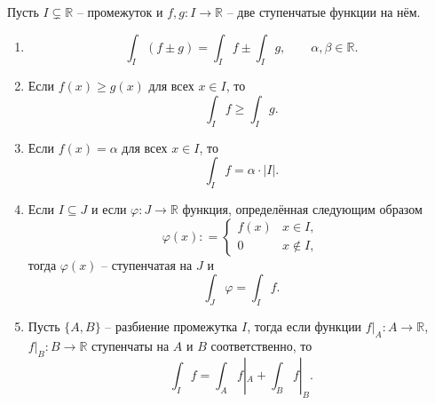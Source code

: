\begin{theorem}\label{imprtant_for_int}
    Пусть $I \subsetneq \mathbb{R}$ -- промежуток и $f,g:I \to \mathbb{R}$ -- две ступенчатые функции на нём.
    \begin{enumerate}
        \item \[
        \int_I( f \pm  g) =  \int_I f  \pm  \int_I g , \qquad \alpha, \beta \in \mathbb{R}.
        \]
        \item Если $f(x) \ge g(x)$ для всех $x \in I$, то
        \[
         \int_I f \ge \int_I g.
        \]

        \item Если $f(x) = \alpha$ для всех $x \in I$, то
        \[
         \int_I f = \alpha \cdot |I|.
        \]
        \item Если $I \subseteq J$ и если $\varphi: J \to \mathbb{R}$ функция, определённая следующим образом
        \[
         \varphi(x) : = \begin{cases}
             f(x) & x \in I,\\
             0 & x \notin I,
         \end{cases}
                 \]
    тогда $\varphi(x)$ -- ступенчатая на $J$ и 
    $$\int_J\varphi   = \int_I f.$$
    
    \item Пусть $\{A,B\}$ -- разбиение промежутка $I$, тогда если функции $f|_A:A \to \mathbb{R}$, $f|_B:B \to \mathbb{R}$ ступенчаты на $A$ и $B$ соответственно, то
    \[
     \int_I f  = \int_A f|_A  + \int_B f|_B .
    \]

    \end{enumerate}
\end{theorem}

